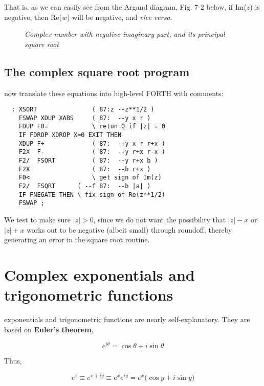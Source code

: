 That is, as we can easily see from the Argand diagram, Fig. 7-2 below, if Im($z$) is negative, then Re($w$) will be negative, and \textit{vice versa}.

\begin{figure}
    \center
    \caption{\textit{Complex number with negative imaginary part, and its principal square root}}
    \label{fig:07_02}
\end{figure}

\subsection{The complex square root program}
 now translate these equations into high-level FORTH with comments:

\begin{lstlisting}
  : XSORT               ( 87:z --z**1/2 )
    FSWAP XDUP XABS     ( 87:  --y x r )
    FDUP F0=            \ retun 0 if |z| = 0
    IF FDROP XDROP X=0 EXIT THEN
    XDUP F+             ( 87:  --y x r r+x )
    F2X  F-             ( 87:  --y r+x r-x )
    F2/  FSORT          ( 87:  --y r+x b )
    F2X                 ( 87:  --b r+x )
    F0<                 \ get sign of Im(z)
    F2/  FSQRT      ( --f 87:  --b |a| )
    IF FNEGATE THEN \ fix sign of Re(z**1/2)
    FSWAP ;
\end{lstlisting}

We test to make sure $\lvert z \rvert > 0$, since we do not want the possibility that $\lvert z \rvert - x$ or $\lvert z \rvert + x$ works out to be negative (albeit small) through roundoff, thereby generating an error in the square root routine.

\section{Complex exponentials and trigonometric functions}
 exponentials and trigonometric functions are nearly self-explanatory. They are based on \textbf{Euler's theorem},

\begin{equation*}
  e^{i\theta} = \cos\theta + i \sin\theta
\end{equation*}

Thus,

\begin{equation}
  e^z \equiv e^{x + iy} \equiv e^x e^{iy} = e^x\big(\cos y + i \sin y\big)
\end{equation}

